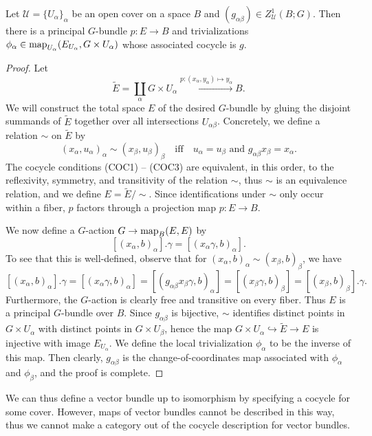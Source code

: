 \documentclass[a4paper,openany]{scrbook}
\begin{document}
\begin{prop}\label{prop:cocycleexistence}
Let $\mathcal U = \{U_\alpha\}_\alpha$ be an open cover on a space $B$ and $(g_{\alpha\beta}) \in Z^1_{\mathcal U}(B;G)$. Then there is a principal $G$-bundle $p\colon E \to B$ and trivializations $\phi_\alpha\in \operatorname{map}_{U_\alpha}(E_{U_\alpha},G \times U_{\alpha})$ whose associated cocycle is $g$.
\end{prop}
\begin{proof}
Let
\[
\tilde E = \coprod_{\alpha} G \times U_\alpha \xrightarrow{p\colon (x_\alpha,y_\alpha) \mapsto y_\alpha} B.
\]
We will construct the total space $E$ of the desired $G$-bundle by gluing the disjoint summands of $\tilde E$ together over all intersections $U_{\alpha\beta}$. Concretely, we define a relation $\sim$ on $\tilde E$ by
\[
  (x_\alpha,u_\alpha)_{\alpha} \sim (x_\beta,u_\beta)_{\beta} \quad \text{iff} \quad u_\alpha=u_\beta \text{ and } g_{\alpha\beta}x_\beta = x_\alpha.
\]
The cocycle conditions (COC1) -- (COC3) are equivalent, in this order, to the reflexivity, symmetry, and transitivity of the relation $\sim$, thus $\sim$ is an equivalence relation, and we define $E = \tilde E/\sim$. Since identifications under $\sim$ only occur within a fiber, $p$ factors through a projection map $p\colon E \to B$.

We now define a $G$-action $G \to \operatorname{map}_B(E,E)$ by
\[
  [(x_\alpha,b)_{\alpha}].\gamma = [(x_\alpha\gamma,b)_{\alpha}].
\]
To see that this is well-defined, observe that for $(x_{\alpha},b)_{\alpha} \sim (x_\beta,b)_{\beta}$, we have
\[
  [(x_\alpha,b)_{\alpha}].\gamma = [(x_\alpha\gamma,b)_{\alpha}] =[(g_{\alpha\beta}x_\beta\gamma,b)_{\alpha}]=[(x_\beta\gamma,b)_{\beta}] = [(x_\beta,b)_{\beta}].\gamma  .
\]
Furthermore, the $G$-action is clearly free and transitive on every fiber. Thus $E$ is a principal $G$-bundle over $B$. Since $g_{\alpha\beta}$ is bijective, $\sim$ identifies distinct points in $G \times U_\alpha$ with distinct points in $G \times U_\beta$, hence the map $G \times U_\alpha \hookrightarrow \tilde E \to E$ is injective with image $E_{U_\alpha}$. We define the local trivialization $\phi_\alpha$ to be the inverse of this map. Then clearly, $g_{\alpha\beta}$ is the change-of-coordinates map associated with $\phi_\alpha$ and $\phi_\beta$, and the proof is complete.
\end{proof}

We can thus define a vector bundle up to isomorphism by specifying a cocycle for some cover. However, maps of vector bundles cannot be described in this way, thus we cannot make a category out of the cocycle description for vector bundles. 
\end{document}
